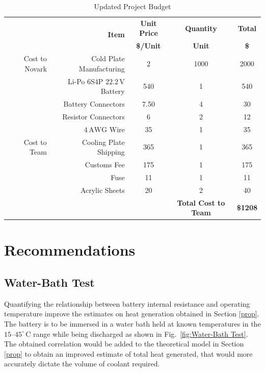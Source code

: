 \documentclass[11pt]{article}
\numberwithin{equation}{subsection} %
\newcommand{\unit}[1]{\ensuremath{\, \mathrm{#1}}}             %
\newcommand{\degree}{^\circ}                                   %
\begin{document}
\begin{table}[!htb]
  \centering
    \caption{Updated Project Budget}
    \label{table:budget}
	\begin{tabular}{r | r | c | c c}
	& \multirow{2}{*}{\textbf{Item}} & \textbf{Unit Price} & \textbf{Quantity} & \textbf{Total} \\
	&                                & \textbf{\$/Unit}    & \textbf{Unit}     & \textbf{\$}
	 \\ \hline
		
	
    \multirow{1}{*}{Cost to Novark}  & Cold Plate Manufacturing           & 2      &1000    & 2000  \\  
    \hline
    \multirow{9}{*}{Cost to Team}    & Li-Po 6S4P $22.2\unit{V}$ Battery  & 540   & 1   & 540 \\
	                                 & Battery Connectors                 & 7.50  & 4   & 30  \\ 
	                                 & Resistor Connectors                & 6     & 2   & 12  \\ 
	                                 & $4\unit{AWG}$ Wire                 & 35    & 1   & 35  \\
	                                 & Cooling Plate Shipping             & 365   &1    &365  \\  
	                                 & Customs Fee                        & 175   &1    &175  \\ 
	                                 & Fuse                               & 11    &1    &11  \\
	                                 & Acrylic Sheets                     & 20    &2    &40  \\
	\hline
	
	& & & \textbf{Total Cost to Team} & \textbf{\$1208} \\
	\end{tabular}
\end{table}

\section{Recommendations}
\subsection{Water-Bath Test}
Quantifying the relationship between battery internal resistance and operating temperature improve the estimates on heat generation obtained in Section \ref{prop}. The battery is to be immersed in a water bath held at known temperatures in the $15$--$45\degree\unit{C}$ range while being discharged as shown in Fig.~\ref{fig:Water-Bath Test}. The obtained correlation would be added to the theoretical model in Section \ref{prop} to obtain an improved estimate of total heat generated, that would more accurately dictate the volume of coolant required.
\end{document}
